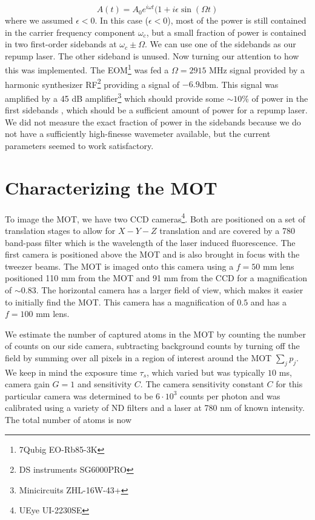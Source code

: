 \begin{equation}
    A(t) = A_0 e^{i \omega t}(1+i \epsilon \sin(\Omega t)
\end{equation}
where we assumed $\epsilon < 0$. In this case ($\epsilon <0$), most of the power is still contained in the carrier frequency component $\omega_c$, but a small fraction of power is contained in two first-order sidebands at $\omega_c \pm \Omega$.
We can use one of the sidebands as our repump laser. 
The other sideband is unused. 
Now turning our attention to how this was implemented.
The EOM\footnote{7Qubig EO-Rb85-3K} was fed a $\Omega = 2915$ MHz signal provided by a harmonic synthesizer RF\footnote{DS instruments SG6000PRO} providing a signal of $-6.9$dbm.
This signal was amplified by a 45 dB amplifier\footnote{Minicircuits ZHL-16W-43+} which should provide some $\sim 10$\% of power in the first sidebands \cite{Rens2014}, which should be a sufficient amount of power for a repump laser. 
We did not measure the exact fraction of power in the sidebands because we do not have a sufficiently high-finesse wavemeter available, but the current parameters seemed to work satisfactory. 


\section{Characterizing the MOT}\label{sec:MOTresult}

To image the MOT, we have two CCD cameras\footnote{UEye UI-2230SE}.
Both are positioned on a set of translation stages to allow for $X-Y-Z$ translation and are covered by a 780 band-pass filter which is the wavelength of the laser induced fluorescence.
The first camera is positioned above the MOT and is also brought in focus with the tweezer beams. 
The MOT is imaged onto this camera using a $f=50$ mm lens positioned 110 mm from the MOT and 91 mm from the CCD for a magnification of $\sim 0.83$.
The horizontal camera has a larger field of view, which makes it easier to initially find the MOT. 
This camera has a magnification of $0.5$ and has a $f=100$ mm lens. 
   
We estimate the number of captured atoms in the MOT by counting the number of counts on our side camera, subtracting background counts by turning off the field by summing over all pixels in a region of interest around the MOT $\sum_j p_j$.
We keep in mind the exposure time $\tau_s$, which varied but was typically $10$ ms, camera gain $G = 1$ and sensitivity $C$.
The camera sensitivity constant $C$ for this particular camera was determined to be $6 \cdot 10^3$ counts per photon and was calibrated using a variety of ND filters and a laser at 780 nm of known intensity. The total number of atoms is now
 
